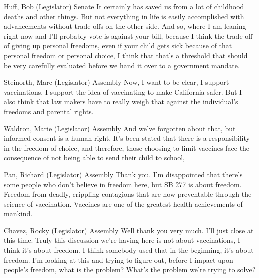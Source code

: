 \begin{result}{8.933851997852667}{Huff, Bob (Legislator) Senate}
It certainly has saved us from a lot of childhood deaths and other things. But not everything in life is easily accomplished with advancements without trade-offs on the other side. And so, where I am leaning right now and I'll probably vote is against your bill, because I think the trade-off of giving up personal freedoms, even if your child gets sick because of that personal freedom or personal choice, I think that that's a threshold that should be very carefully evaluated before we hand it over to a government mandate.
\end{result}

\begin{result}{8.197005128910773}{Steinorth, Marc (Legislator) Assembly}
Now, I want to be clear, I support vaccinations. I support the idea of vaccinating to make California safer. But I also think that law makers have to really weigh that against the individual's freedoms and parental rights.
\end{result}

\begin{result}{7.276205318374071}{Waldron, Marie (Legislator) Assembly}
And we've forgotten about that, but informed consent is a human right. It's been stated that there is a responsibility in the freedom of choice, and therefore, those choosing to limit vaccines face the consequence of not being able to send their child to school,
\end{result}

\begin{result}{6.269083798264194}{Pan, Richard (Legislator) Assembly}
Thank you. I'm disappointed that there's some people who don't believe in freedom here, but SB 277 is about freedom. Freedom from deadly, crippling contagions that are now preventable through the science of vaccination. Vaccines are one of the greatest health achievements of mankind.
\end{result}

\begin{result}{5.840766769352013}{Chavez, Rocky (Legislator) Assembly}
Well thank you very much. I'll just close at this time. Truly this discussion we're having here is not about vaccinations, I think it's about freedom. I think somebody used that in the beginning, it's about freedom. I'm looking at this and trying to figure out, before I impact upon people's freedom, what is the problem? What's the problem we're trying to solve?
\end{result}

